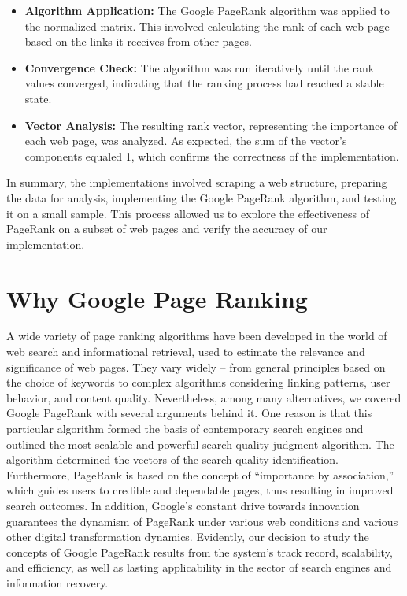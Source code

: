 \documentclass{article}
\begin{document}
\begin{itemize}
    \item \textbf{Algorithm Application:} The Google PageRank algorithm was applied to the normalized matrix. This involved calculating the rank of each web page based on the links it receives from other pages.
    
    \item \textbf{Convergence Check:} The algorithm was run iteratively until the rank values converged, indicating that the ranking process had reached a stable state.
    
    \item \textbf{Vector Analysis:} The resulting rank vector, representing the importance of each web page, was analyzed. As expected, the sum of the vector's components equaled 1, which confirms the correctness of the implementation.
\end{itemize}


In summary, the implementations involved scraping a web structure, preparing the data for analysis, implementing the Google PageRank algorithm, and testing it on a small sample. This process allowed us to explore the effectiveness of PageRank on a subset of web pages and verify the accuracy of our implementation.

\section{Why Google Page Ranking}

A wide variety of page ranking algorithms have been developed in the world of web search and informational retrieval, used to estimate the relevance and significance of web pages. They vary widely – from general principles based on the choice of keywords to complex algorithms considering linking patterns, user behavior, and content quality. Nevertheless, among many alternatives, we covered Google PageRank with several arguments behind it. One reason is that this particular algorithm formed the basis of contemporary search engines and outlined the most scalable and powerful search quality judgment algorithm. The algorithm determined the vectors of the search quality identification. Furthermore, PageRank is based on the concept of “importance by association,” which guides users to credible and dependable pages, thus resulting in improved search outcomes. In addition, Google’s constant drive towards innovation guarantees the dynamism of PageRank under various web conditions and various other digital transformation dynamics. Evidently, our decision to study the concepts of Google PageRank results from the system’s track record, scalability, and efficiency, as well as lasting applicability in the sector of search engines and information recovery.
\end{document}
